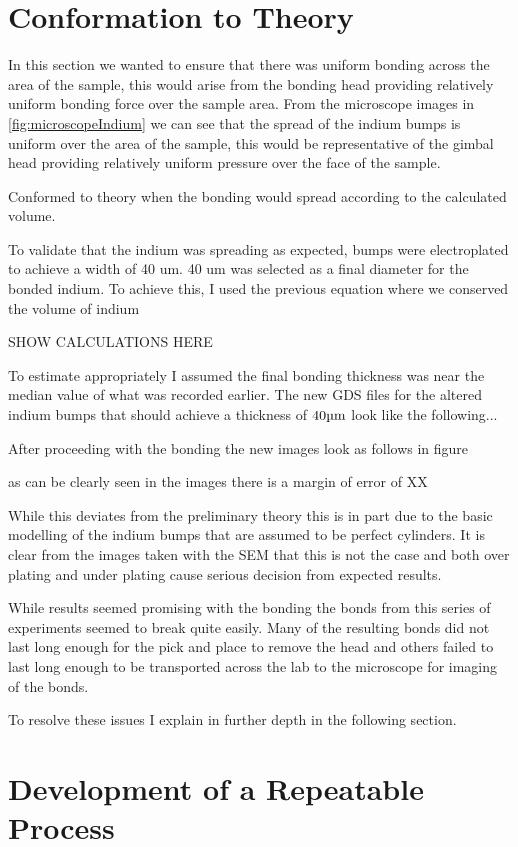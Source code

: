 \section{Conformation to Theory}
In this section we wanted to ensure that there was uniform bonding across the area of the sample, this would arise from the bonding head providing relatively uniform bonding force over the sample area. From the microscope images in \ref{fig:microscopeIndium} we can see that the spread of the indium bumps is uniform over the area of the sample, this would be representative of the gimbal head providing relatively uniform pressure over the face of the sample.

Conformed to theory when the bonding would spread according to the calculated volume.

To validate that the indium was spreading as expected, bumps were electroplated to achieve a width of 40 um. 40 um was selected as a final diameter for the bonded indium. To achieve this, I used the previous equation where we conserved the volume of indium %

SHOW CALCULATIONS HERE

To estimate appropriately I assumed the final bonding thickness was near the median value of what was recorded earlier. The new GDS files for the altered indium bumps that should achieve a thickness of $40 \um$ look like the following...

After proceeding with the bonding the new images look as follows in figure


as can be clearly seen in the images there is a margin of error of XX%

While this deviates from the preliminary theory this is in part due to the basic modelling of the indium bumps that are assumed to be perfect cylinders. It is clear from the images taken with the SEM that this is not the case and both over plating and under plating cause serious decision from expected results.

While results seemed promising with the bonding the bonds from this series of experiments seemed to break quite easily. Many of the resulting bonds did not last long enough for the pick and place to remove the head and others failed to last long enough to be transported across the lab to the microscope for imaging of the bonds.

To resolve these issues I explain in further depth in the following section.


\section{Development of a Repeatable Process}
\label{sec:Ch2_repeatable}

